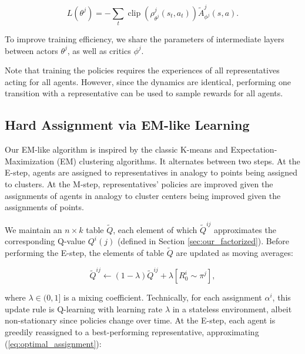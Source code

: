 \documentclass[letterpaper]{article} %
\DeclareMathOperator*{\clip}{clip}
\begin{document}
\begin{equation}\label{eq:loss_our_actor}
    L(\theta^j) = - \sum_t \clip(\rho_{\theta^j}^j(s_t, a_t)) \tilde{A}_{\phi^j}^j(s, a).
\end{equation}

\noindent To improve training efficiency, we share the parameters of intermediate layers between actors $\theta^j$, as well as critics $\phi^j$.

Note that training the policies requires the experiences of all representatives acting for all agents. However, since the dynamics are identical, performing one transition with a representative can be used to sample rewards for all agents.%



\subsection{Hard Assignment via EM-like Learning}\label{sec:our_hard}

Our EM-like algorithm is inspired by the classic K-means \cite{macqueen1967classification,lloyd1982least} and Expectation-Maximization (EM) \cite{dempster1977maximum} clustering algorithms. It alternates between two steps. At the E-step, agents are assigned to representatives in analogy to points being assigned to clusters. At the M-step, representatives' policies are improved given the assignments of agents in analogy to cluster centers being improved given the assignments of points.

We maintain an $n \times k$ table $\tilde{Q}$, each element of which $\tilde{Q}^{ij}$ approximates the corresponding Q-value $Q^i(j)$ (defined in Section \ref{sec:our_factorized}). Before performing the E-step, the elements of table $\tilde{Q}$ are updated as moving averages:

\begin{equation}\label{eq:hard_Q_table}
    \tilde{Q}^{ij} \leftarrow (1 - \lambda) \tilde{Q}^{ij} + \lambda [R_0^i \sim \pi^j],
\end{equation}

\noindent where $\lambda \in (0, 1]$ is a mixing coefficient. Technically, for each assignment $\alpha^i$, this update rule is Q-learning with learning rate $\lambda$ in a stateless environment, albeit non-stationary since policies change over time. At the E-step, each agent is greedily reassigned to a best-performing representative, approximating (\ref{eq:optimal_assignment}):
\end{document}
